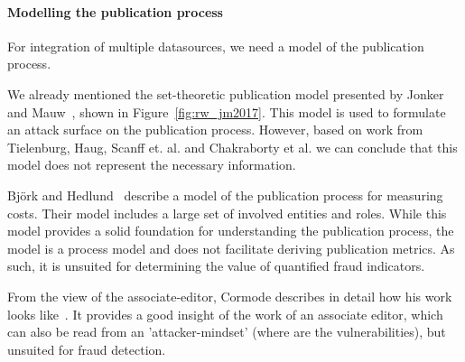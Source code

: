 \documentclass{ou-report}
\begin{document}




\paragraph{Modelling the publication process} \label{rw_publication_process}
For integration of multiple datasources, we need a model of the publication 
process.

We already mentioned the set-theoretic publication model presented by 
Jonker and Mauw~\cite{JM2017}, shown in Figure~\ref{fig:rw_jm2017}. This model
is used to formulate an attack surface on the publication process. However, 
based on work from Tielenburg, Haug, Scanff et. al. and Chakraborty et al. we 
can conclude that this model does not represent the necessary information.

Björk and Hedlund~\cite{BH2004} describe a  model of the publication process
for measuring costs. Their model includes a large set of involved entities
and roles. While this model provides a solid foundation for understanding the
publication process, the model is a process model and does not facilitate
deriving publication metrics. As such, it is unsuited for determining
the value of quantified fraud indicators.

From the view of the associate-editor, Cormode describes in detail how his work
looks like~\cite{C2013}. It provides a good insight of the work of an associate 
editor, which can also be read from an 'attacker-mindset' (where are the 
vulnerabilities), but unsuited for fraud detection.

\end{document}
